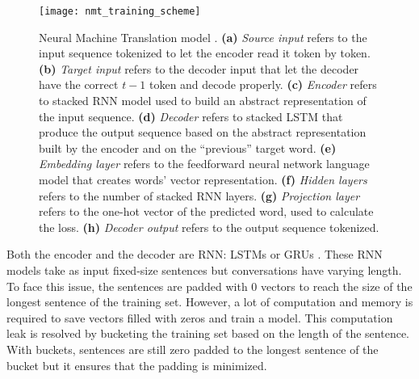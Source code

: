 \begin{figure}
    \centering
    \texttt{[image: nmt\_training\_scheme]}
    \caption[Neural Machine Translation model scheme]{Neural Machine Translation model \citep{tensorflow.nmt}. \textbf{(a)} \textit{Source input} refers to the input sequence tokenized to let the encoder read it token by token. \textbf{(b)} \textit{Target input} refers to the decoder input that let the decoder have the correct $t-1$ token and decode properly. \textbf{(c)} \textit{Encoder} refers to stacked RNN model used to build an abstract representation of the input sequence. \textbf{(d)} \textit{Decoder} refers to stacked LSTM that produce the output sequence based on the abstract representation built by the encoder and on the ``previous'' target word. \textbf{(e)} \textit{Embedding layer} refers to the feedforward neural network language model that creates words' vector representation. \textbf{(f)} \textit{Hidden layers} refers to the number of stacked RNN layers. \textbf{(g)} \textit{Projection layer} refers to the one-hot vector of the predicted word, used to calculate the loss. \textbf{(h)} \textit{Decoder output} refers to the output sequence tokenized.}
    \label{fig:nmt}
\end{figure}

Both the encoder and the decoder are RNN: LSTMs \citep{1409.3215,1508.04025} or GRUs \citep{1706.05125,1503.02364}. These RNN models take as input fixed-size sentences but conversations have varying length. To face this issue, the sentences are padded with $0$ vectors to reach the size of the longest sentence of the training set. However, a lot of computation and memory is required to save vectors filled with zeros and train a model. This computation leak is resolved by bucketing the training set based on the length of the sentence. With buckets, sentences are still zero padded to the longest sentence of the bucket but it ensures that the padding is minimized.


